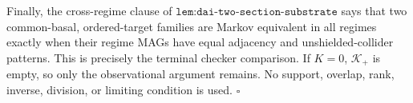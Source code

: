 Finally, the cross-regime clause of \(\texttt{lem:dai-two-section-substrate}\) says that two common-basal, ordered-target families are Markov equivalent in all regimes exactly when their regime MAGs have equal adjacency and unshielded-collider patterns.  This is precisely the terminal checker comparison.  If \(K=0\), \(\mathcal K_+\) is empty, so only the observational argument remains.  No support, overlap, rank, inverse, division, or limiting condition is used. \(\square\)